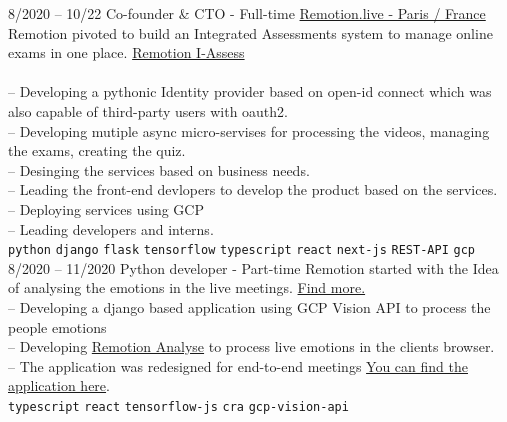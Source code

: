 \documentclass[9pt]{developercv}
\begin{document}
\begin{entrylist}
	\entry
	{8/2020 -- 10/22}
	{Co-founder \& CTO - Full-time}
	{\href{https://remotion.live/}{Remotion.live - Paris / France }}
	{Remotion pivoted to build an Integrated Assessments system to manage online exams in one place.
		\href{https://remotion.live/} {Remotion I-Assess} \\\\
		-- Developing a pythonic Identity provider based on open-id connect which was also capable of third-party users with oauth2. \\
		-- Developing mutiple async micro-servises for processing the videos, managing the exams, creating the quiz. \\
		-- Desinging the services based on business needs. \\
		-- Leading the front-end devlopers to develop the product based on the services. \\
		-- Deploying services using GCP \\
		-- Leading developers and interns. \\
		\texttt{python}\slashsep
		\texttt{django}\slashsep
		\texttt{flask}\slashsep
		\texttt{tensorflow}\slashsep
		\texttt{typescript}\slashsep
		\texttt{react}\slashsep
		\texttt{next-js}\slashsep
		\texttt{REST-API}\slashsep
		\texttt{gcp}\slashsep
	}
	\entry
	{8/2020 -- 11/2020}
	{Python developer - Part-time}
	{}
	{Remotion started with the Idea of analysing the emotions in the live meetings.
		\href{https://remotion.live/} {Find more.} \\
		-- Developing a django based application using GCP Vision API to process the people emotions \\
		-- Developing \href{https://analyse.remotion.live/} {Remotion Analyse} to process live emotions in the clients browser. \\
		-- The application was redesigned for end-to-end meetings \href{https://radious.fr/} {\space You can find the application here}. \\
		\texttt{typescript}\slashsep
		\texttt{react}\slashsep
		\texttt{tensorflow-js}\slashsep
		\texttt{cra}\slashsep
		\texttt{gcp-vision-api}\slashsep
	}


\end{entrylist}
\end{document}
